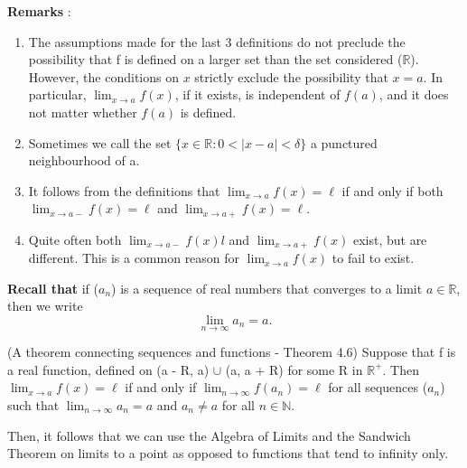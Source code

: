 \documentclass[12pt]{article}
\begin{document}
			{\bf{Remarks}} : 
			\begin{enumerate}
				\item The assumptions made for the last 3 definitions do not preclude the possibility that f is 						defined on a larger set than the set considered ($\mathbb{R}$). However, the conditions on 						$x$ strictly exclude the possibility that $x = a$. In particular, $\lim_{x \to a}{f(x)}$, 							if it exists, is independent of $f(a)$, and it does not matter whether $f(a)$ is defined.                    

				\item Sometimes we call the set $\{x \in \mathbb{R} : 0 < |x - a| < \delta \}$ a punctured 							neighbourhood of a.

				\item It follows from the definitions that $\lim_{x \to a}{f(x)} = \ell$ if and only if both $\lim_{x \to 						 a-}{f(x)} = \ell$ and $\lim_{x \to a+}{f(x)} = \ell$.

				\item Quite often both  $\lim_{x \to a-}{f(x)}l$ and  $\lim_{x \to a+}{f(x)}$ exist, but are different. 						This is a common reason for  $\lim_{x \to a}{f(x)}$ to fail to exist.
			\end{enumerate}

			{\bf{Recall that}} if ($a_n$) is a sequence of real numbers that converges to a limit $a \in \mathbb{R}$, 							then we write
				\[
					\lim_{n \to \infty}{a_n} = a.
				\]

			\begin{thm}
				(A theorem connecting sequences and functions - Theorem 4.6) Suppose that f is a real function, 						defined on (a - R, a) $\cup$ (a, a + R) for some R in $\mathbb{R}^+$. Then $\lim_{x \to a}						{f(x)} = \ell$ if and only if $\lim_{n \to \infty}{f(a_n)} = \ell$ for all sequences ($a_n$) such 						that $\lim_{n \to \infty}{a_n} = a$ and $a_n \neq a$ for all $n \in \mathbb{N}$.
			\end{thm}

			Then, it follows that we can use the Algebra of Limits and the Sandwich Theorem on limits to a point as 						opposed to functions that tend to infinity only.					
\end{document}
